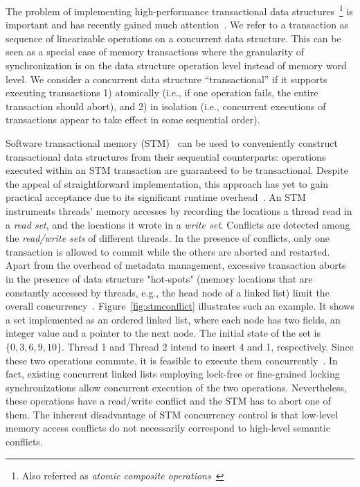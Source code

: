 \documentclass[]{sig-alternate-05-2015}
\begin{document}
The problem of implementing high-performance transactional data structures~\footnote{Also referred as \emph{atomic composite operations}~\cite{golan2013concurrent}} is important and has recently gained much attention~\cite{golan2013concurrent,bronson2010transactional,herlihy2008transactional,gramoli2013composing,golan2015automatic,hassan2014integrating,koskinen2010coarse}. 
We refer to a transaction as sequence of linearizable operations on a concurrent data structure.
This can be seen as a special case of memory transactions where the granularity of synchronization is on the data structure operation level instead of memory word level.
We consider a concurrent data structure ``transactional'' if it supports executing transactions 1) atomically (i.e., if one operation fails, the entire transaction should abort), and 2) in isolation (i.e., concurrent executions of transactions appear to take effect in some sequential order).

Software transactional memory (STM)~\cite{shavit1997software,herlihy2003software} can be used to conveniently construct transactional data structures from their sequential counterparts: operations executed within an STM transaction are guaranteed to be transactional.
Despite the appeal of straightforward implementation, this approach has yet to gain practical acceptance due to its significant runtime overhead~\cite{cascaval2008software}.
An STM instruments threads' memory accesses by recording the locations a thread read in a \emph{read set}, and the locations it wrote in a \emph{write set}. 
Conflicts are detected among the \emph{read/write sets} of different threads. 
In the presence of conflicts, only one transaction is allowed to commit while the others are aborted and restarted.
Apart from the overhead of metadata management, excessive transaction aborts in the presence of data structure "hot-spots" (memory locations that are constantly accessed by threads, e.g., the head node of a linked list) limit the overall concurrency~\cite{herlihy2008transactional}.
Figure~\ref{fig:stmconflict} illustrates such an example.
It shows a set implemented as an ordered linked list, where each node has two fields, an integer value and a pointer to the next node.
The initial state of the set is $\{0,3,6,9,10\}$.
Thread 1 and Thread 2 intend to insert 4 and 1, respectively.
Since these two operations commute, it is feasible to execute them concurrently~\cite{clements2015scalable}.
In fact, existing concurrent linked lists employing lock-free or fine-grained locking synchronizations allow concurrent execution of the two operations.
Nevertheless, these operations have a read/write conflict and the STM has to abort one of them. 
The inherent disadvantage of STM concurrency control is that low-level memory access conflicts do not necessarily correspond to high-level semantic conflicts.
\end{document}
